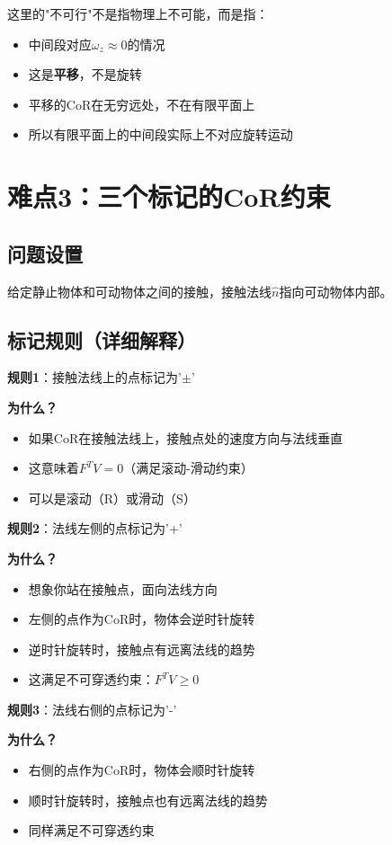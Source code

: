 \documentclass[12pt,a4paper]{article}
\begin{document}
这里的"不可行"不是指物理上不可能，而是指：
\begin{itemize}
\item 中间段对应$\omega_z \approx 0$的情况
\item 这是\textbf{平移}，不是旋转
\item 平移的CoR在无穷远处，不在有限平面上
\item 所以有限平面上的中间段实际上不对应旋转运动
\end{itemize}

\section{难点3：三个标记的CoR约束}

\subsection{问题设置}

给定静止物体和可动物体之间的接触，接触法线$\hat{n}$指向可动物体内部。

\subsection{标记规则（详细解释）}

\textbf{规则1}：接触法线上的点标记为'$\pm$'

\textbf{为什么？}
\begin{itemize}
\item 如果CoR在接触法线上，接触点处的速度方向与法线垂直
\item 这意味着$F^T V = 0$（满足滚动-滑动约束）
\item 可以是滚动（R）或滑动（S）
\end{itemize}

\textbf{规则2}：法线左侧的点标记为'+'

\textbf{为什么？}
\begin{itemize}
\item 想象你站在接触点，面向法线方向
\item 左侧的点作为CoR时，物体会逆时针旋转
\item 逆时针旋转时，接触点有远离法线的趋势
\item 这满足不可穿透约束：$F^T V \geq 0$
\end{itemize}

\textbf{规则3}：法线右侧的点标记为'-'

\textbf{为什么？}
\begin{itemize}
\item 右侧的点作为CoR时，物体会顺时针旋转
\item 顺时针旋转时，接触点也有远离法线的趋势
\item 同样满足不可穿透约束
\end{itemize}
\end{document}
